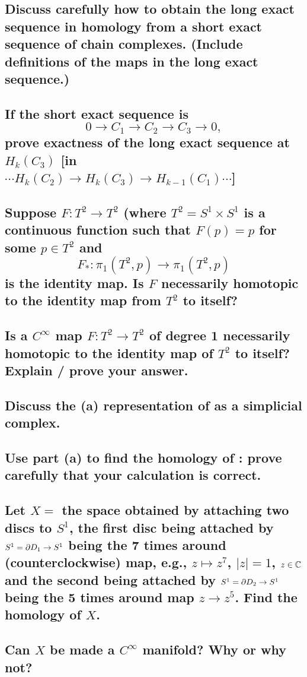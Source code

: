 \documentclass[10pt]{article}
\begin{document}
\advsection{}

\subsection{Discuss carefully how to obtain the long exact sequence in homology from a short exact
  sequence of chain complexes. (Include definitions of the maps in the long exact sequence.)}

\subsection{If the short exact sequence is 
$$0 \to C_1 \to C_2 \to C_3 \to 0,$$
prove exactness of the long exact sequence at $H_k(C_3)$ [in $\cdots H_k (C_2) \to H_k(C_3) \to
H_{k-1}(C_1) \cdots$]}

\advsection{}

\subsection{Suppose $F: T^2 \to T^2$ (where $T^2 = S^1 \times S^1$ is a continuous function such
  that $F(p ) =p$ for some $p \in T^2$ and
$$F_* : \pi_1(T^2, p) \to \pi_1(T^2, p) $$
is the identity map. Is $F$ necessarily homotopic to the identity map from $T^2$ to itself?  }

\subsection{Is a $C^\infty$ map $F: T^2 \to T^2$ of degree 1 necessarily homotopic to the identity
  map of $T^2$ to itself? Explain / prove your answer.}

\advsection{}

\subsection{Discuss the (a) representation of  as a simplicial complex.}

\subsection{Use part (a) to find the homology of : prove carefully that your
  calculation is correct.}

\advsection{}

\subsection{Let $X =$ the space obtained by attaching two discs to $S^1$, the first disc being
  attached by $S^1 = \partial D_1 \to S^1$ being the 7 times around (counterclockwise) map, e.g.,
  $z\mapsto z^7$, $|z|=1$, $z \in \mathbb{C} $ and the second being attached by $S^1 = \partial D_2 \to
  S^1$ being the 5 times around map $z \to z^5$. Find the homology of $X$.}


\subsection{Can $X$ be made a $C^\infty$ manifold? Why or why not?}
\end{document}
